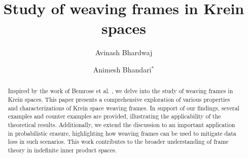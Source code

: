 \documentclass[article,12pt]{amsart}
\begin{document}
\title[Study of weaving frames in Krein spaces]{Study of weaving frames in Krein spaces}




\author[A. Bhardwaj]{Avinash Bhardwaj}


\author[A. Bhandari]{Animesh Bhandari$^*$}
\address{Department of Mathematics\\ SRM University, {\it AP} - Andhra Pradesh\\ Neeru Konda, Amaravati, Andhra Pradesh - 522502\\ India}



\begin{abstract}
Inspired by the work of Bemrose et al. \cite{Be16}, we delve into the study of weaving frames in Krein spaces. This paper presents a comprehensive exploration of various properties and characterizations of Krein space weaving frames. In support of our findings, several examples and counter examples are provided, illustrating the applicability of the theoretical results. Additionally, we extend the discussion to an important application in probabilistic erasure, highlighting how weaving frames can be used to mitigate data loss in such scenarios. This work contributes to the broader understanding of frame theory in indefinite inner product spaces.

\end{abstract}
\end{document}
